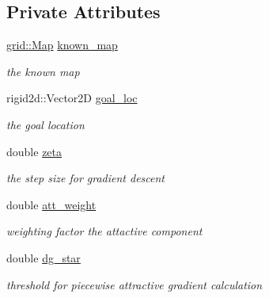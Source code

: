 \subsection*{Private Attributes}
\begin{DoxyCompactItemize}
\item 
\mbox{\label{classpfield_1_1PtField_af42c90549ef5781d7ace3750a64204fb}} 
\hyperlink{structgrid_1_1Map}{grid\+::\+Map} \hyperlink{classpfield_1_1PtField_af42c90549ef5781d7ace3750a64204fb}{known\+\_\+map}
\begin{DoxyCompactList}\small\item\em the known map \end{DoxyCompactList}\item 
\mbox{\label{classpfield_1_1PtField_abfa912b088856926772dc828a5d62671}} 
rigid2d\+::\+Vector2D \hyperlink{classpfield_1_1PtField_abfa912b088856926772dc828a5d62671}{goal\+\_\+loc}
\begin{DoxyCompactList}\small\item\em the goal location \end{DoxyCompactList}\item 
\mbox{\label{classpfield_1_1PtField_a07f90e3a7188276be1f3854f11930c3a}} 
double \hyperlink{classpfield_1_1PtField_a07f90e3a7188276be1f3854f11930c3a}{zeta}
\begin{DoxyCompactList}\small\item\em the step size for gradient descent \end{DoxyCompactList}\item 
\mbox{\label{classpfield_1_1PtField_a43a4e144b8906c64823e872ff270d4c5}} 
double \hyperlink{classpfield_1_1PtField_a43a4e144b8906c64823e872ff270d4c5}{att\+\_\+weight}
\begin{DoxyCompactList}\small\item\em weighting factor the attactive component \end{DoxyCompactList}\item 
\mbox{\label{classpfield_1_1PtField_adadbef461c9255b0c60301508f4cab37}} 
double \hyperlink{classpfield_1_1PtField_adadbef461c9255b0c60301508f4cab37}{dg\+\_\+star}
\begin{DoxyCompactList}\small\item\em threshold for piecewise attractive gradient calculation \end{DoxyCompactList}\item 

\end{DoxyCompactItemize}
